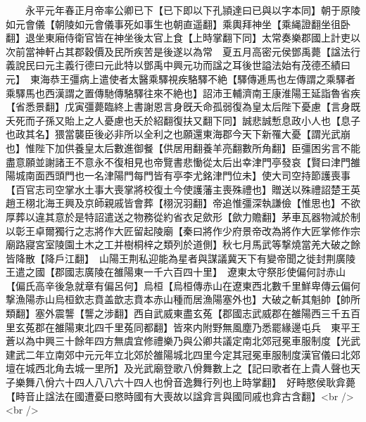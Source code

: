 　　永平元年春正月帝率公卿已下【已下即以下孔頴達曰已與以字本同】朝于原陵如元會儀【朝陵如元會儀事死如事生也朝直遥翻】乘輿拜神坐【乘䋲證翻坐徂卧翻】退坐東廂侍衛官皆在神坐後太官上食【上時掌翻下同】太常奏樂郡國上計吏以次前當神軒占其郡穀價及民所疾苦是後遂以為常　夏五月高密元侯鄧禹薨【諡法行義說民曰元主義行德曰元此特以鄧禹中興元功而諡之耳後世謚法始有茂德丕績曰元】　東海恭王彊病上遣使者太醫乘驛視疾駱驛不絶【驛傳逓馬也左傳謂之乘驛者乘驛馬也西漢謂之置傳馳傳駱驛往來不絶也】詔沛王輔濟南王康淮陽王延詣魯省疾【省悉景翻】戊寅彊薨臨終上書謝恩言身旣夭命孤弱復為皇太后陛下憂慮【言身既夭死而子孫又貽上之人憂慮也夭於紹翻復扶又翻下同】誠悲誠慙息政小人也【息子也政其名】猥當襲臣後必非所以全利之也願還東海郡今天下新罹大憂【謂光武崩也】惟陛下加供養皇太后數進御餐【供居用翻養羊亮翻數所角翻】臣彊困劣言不能盡意願並謝諸王不意永不復相見也帝覽書悲慟從太后出幸津門亭發哀【賢曰津門雒陽城南面西頭門也一名津陽門每門皆有亭李尤銘津門位未】使大司空持節護喪事【百官志司空掌水土事大喪掌將校復土今使護藩主喪殊禮也】贈送以殊禮詔楚王英趙王栩北海王興及京師親戚皆會葬【栩況羽翻】帝追惟彊深執謙儉【惟思也】不欲厚葬以違其意於是特詔遣送之物務從約省衣足歛形【歛力贍翻】茅車瓦器物減於制以彰王卓爾獨行之志將作大匠留起陵廟【秦曰將作少府景帝改為將作大匠掌修作宗廟路寢宮室陵園土木之工并樹桐梓之類列於道側】秋七月馬武等撃燒當羌大破之餘皆降散【降戶江翻】　山陽王荆私迎能為星者與謀議冀天下有變帝聞之徙封荆廣陵王遣之國【郡國志廣陵在雒陽東一千六百四十里】　遼東太守祭肜使偏何討赤山【偏氏高辛後急就章有偏呂何】烏桓【烏桓傳赤山在遼東西北數千里鮮卑傳云偏何撃漁陽赤山烏桓欽志賁盖歆志賁本赤山種而居漁陽塞外也】大破之斬其魁帥【帥所類翻】塞外震讋【讋之涉翻】西自武威東盡玄菟【郡國志武威郡在雒陽西三千五百里玄菟郡在雒陽東北四千里菟同都翻】皆來内附野無風塵乃悉罷緣邊屯兵　東平王蒼以為中興三十餘年四方無虞宜修禮樂乃與公卿共議定南北郊冠冕車服制度【光武建武二年立南郊中元元年立北郊於雒陽城北四里今定其冠冕車服制度漢官儀曰北郊壇在城西北角去城一里所】及光武廟登歌八佾舞數上之【記曰歌者在上貴人聲也天子樂舞八佾六十四人八八六十四人也佾音逸舞行列也上時掌翻】　好畤愍侯耿弇薨【畤音止諡法在國遭憂曰愍時國有大喪故以諡弇言與國同戚也弇古含翻】<br />
<br />
